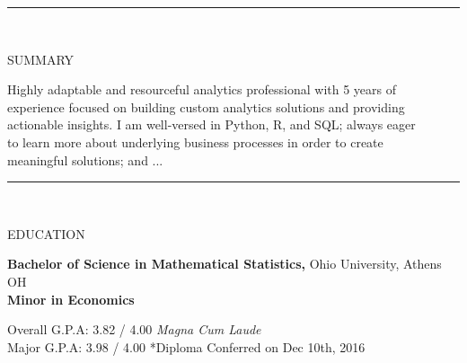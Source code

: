 \documentclass[12pt]{article}
\newcommand{\tab}[1][1cm]{\hspace*{#1}}
\newcommand{\header}[1]{
    \vspace*{-2mm}
    \rule{6.5in}{3pt} \\
    \smallskip
    \begin{large}
	    \textsc{\textcolor{lblue}{#1}}
    \end{large}
    \bigskip
}
\begin{document}
  \pagestyle{empty} %

  \begin{flushleft}
    \header{SUMMARY}

    \tab Highly adaptable and resourceful analytics professional with 5 years of \\
    \tab experience focused on building custom analytics solutions and providing \\
    \tab actionable insights. I am well-versed in Python, R, and SQL; always eager \\
    \tab to learn more about underlying business processes in order to create \\
    \tab meaningful solutions; and ... \\

    \smallskip
  \end{flushleft}
  
  \begin{flushleft}
    \header{EDUCATION}

    \textbf{Bachelor of Science in Mathematical Statistics,} \hfill Ohio University, Athens OH \\
    \textbf{Minor in Economics}

    \tab[0.5cm] Overall G.P.A:  3.82 / 4.00 \tab[0.25cm] \textit{Magna Cum Laude} \\
    \tab[0.5cm] \hspace*{2.08mm}Major G.P.A: 3.98 / 4.00  \hfill \small{*Diploma Conferred on Dec 10th, 2016}

    \smallskip
  \end{flushleft}
\end{document}
